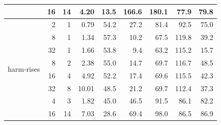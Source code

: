 \begin{tabular}{@{}lrrrrrrrr@{}}
 & 16 & 14 & 4.20 & 13.5 & 166.6 & 180.1 & 77.9 & 79.8 \\
\midrule
\multirow{8}{*}{harm-rises} & 2 & 1 & 0.79 & 54.2 & 27.2 & 81.4 & 92.5 & 75.0 \\
 & 8 & 1 & 1.34 & 57.3 & 10.2 & 67.5 & 119.8 & 39.2 \\
 & 32 & 1 & 1.66 & 53.8 & 9.4 & 63.2 & 115.2 & 15.7 \\
 & 8 & 2 & 2.38 & 55.0 & 14.7 & 69.7 & 116.7 & 48.5 \\
 & 16 & 4 & 4.92 & 52.2 & 17.4 & 69.6 & 115.5 & 42.3 \\
 & 32 & 8 & 10.01 & 48.5 & 21.2 & 69.7 & 112.4 & 37.3 \\
 & 4 & 3 & 1.82 & 45.0 & 46.5 & 91.5 & 86.1 & 82.2 \\
 & 16 & 14 & 7.03 & 28.6 & 69.4 & 98.0 & 86.5 & 86.9 \\
\bottomrule
\end{tabular}
